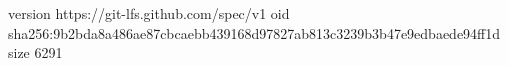 version https://git-lfs.github.com/spec/v1
oid sha256:9b2bda8a486ae87cbcaebb439168d97827ab813c3239b3b47e9edbaede94ff1d
size 6291
